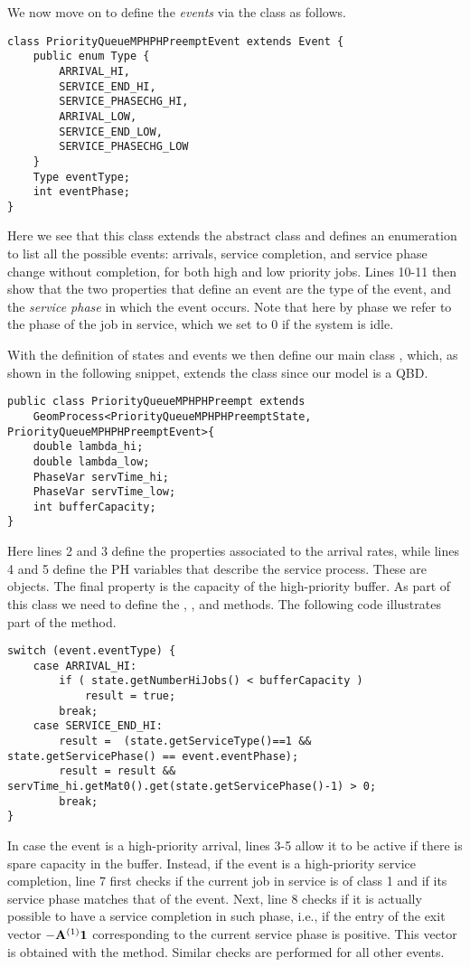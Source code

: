 We now move on to define the \emph{events} via the
 class as follows.
\begin{lstlisting}
class PriorityQueueMPHPHPreemptEvent extends Event {
	public enum Type {
		ARRIVAL_HI,
		SERVICE_END_HI,
		SERVICE_PHASECHG_HI,
		ARRIVAL_LOW,
		SERVICE_END_LOW,
		SERVICE_PHASECHG_LOW
	}
	Type eventType;
	int eventPhase;
}
\end{lstlisting}
Here we see that this class extends the abstract class  and
defines an enumeration  to list all the possible events: arrivals,
service completion, and service phase change without completion, for both high
and low priority jobs. Lines 10-11 then show that the two properties that
define an event are the type of the event, and the \emph{service phase} in
which the event occurs. Note that here by phase we refer to the phase of the
job in service, which we set to 0 if the system is idle.

With the definition of states and events we then define our main class
, which, as shown in the following snippet,
extends the  class since our model is a QBD.
\begin{lstlisting}
public class PriorityQueueMPHPHPreempt extends 
	GeomProcess<PriorityQueueMPHPHPreemptState, PriorityQueueMPHPHPreemptEvent>{
	double lambda_hi;
	double lambda_low;
	PhaseVar servTime_hi;
	PhaseVar servTime_low;
	int bufferCapacity;
}
\end{lstlisting}
Here lines 2 and 3 define the properties associated to the arrival rates, while
lines 4 and 5 define the PH variables that describe the service process. These
are  objects. The final property is the capacity of the
high-priority buffer. As part of this class we need to define the
, , and  methods. The following code
illustrates part of the  method.
\begin{lstlisting}
switch (event.eventType) {
	case ARRIVAL_HI:
		if ( state.getNumberHiJobs() < bufferCapacity )
			result = true;
		break;
	case SERVICE_END_HI:
		result =  (state.getServiceType()==1 && state.getServicePhase() == event.eventPhase);
		result = result && servTime_hi.getMat0().get(state.getServicePhase()-1) > 0;
		break;
}
\end{lstlisting}
In case the event is a high-priority arrival, lines 3-5 allow it to be
active if there is spare capacity in the buffer. Instead, if the event is a
high-priority service completion, line 7 first checks if the
current job in service is of class 1 and if its
service phase matches that of the event. Next, line 8 checks if
it is actually possible to have a service completion in such phase, i.e.,
if the entry of the exit vector $-\bA^{(1)}\one$ corresponding
to the current service phase is positive. This vector is obtained with the
\jPhase {} method. Similar checks are performed for all other
events.

